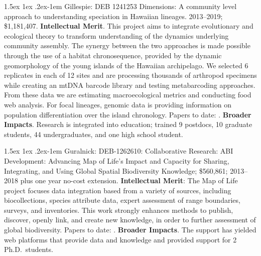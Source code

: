 \documentclass[11pt]{article}
\makeatletter
\renewcommand{\paragraph}{\@startsection{paragraph}{4}{\z@}
  {1.5ex \@plus 1ex \@minus .2ex}{-1em}
  {\normalfont\normalsize\it}
}
\makeatother
\begin{document}
\paragraph{Gillespie}: DEB 1241253 Dimensions: A community level approach
to understanding speciation in Hawaiian lineages. 2013--2019;
\$1,181,407. \textbf{Intellectual Merit}. This project aims to integrate
evolutionary and ecological theory to transform understanding of the
dynamics underlying community assembly. The synergy between the two
approaches is made possible through the use of a habitat chronosequence,
provided by the dynamic geomorphology of the young islands of the
Hawaiian archipelago. We selected 6 replicates in each of 12 sites and
are processing thousands of arthropod specimens while creating an mtDNA
barcode library and testing metabarcoding approaches. From these data we
are estimating macroecological metrics and conducting food web analysis.
For focal lineages, genomic data is providing information on population
differentiation over the island chronology. Papers to date:
\cite{Brewer2015-jo,Brewer2014-xc,Gillespie2013-mz,Shaw2016-aj,Gillespie2016-la,Gillespie2014-xm,Krehenwinkel2017-ea,Rominger2015-kb,Warren2015-zp,Yim2014-pr,Krehenwinkel2018-mz,Krehenwinkel2017-zk,Graham2017-su}.
\textbf{Broader Impacts}. Research is integrated into education; trained
9 postdocs, 10 graduate students, 44 undergraduates, and one high school
student.

\paragraph{Guralnick}: DEB-1262610: Collaborative Research: ABI
Development: Advancing Map of Life's Impact and Capacity for Sharing,
Integrating, and Using Global Spatial Biodiversity Knowledge; \$560,861;
2013--2018 plus one year no-cost extension. \textbf{Intellectual Merit}:
The Map of Life project focuses data integration based from a variety of
sources, including biocollections, species attribute data, expert
assessment of range boundaries, surveys, and inventories. This work
strongly enhances methods to publish, discover, openly link, and create
new knowledge, in order to further assessment of global biodiversity.
Papers to date:
\cite{Guralnick2007-yz,Guralnick2009-zu,Guralnick2010-gw,Jetz2012-uq,Parr2012-gh,Stucky2014-vb,Yilmaz2011-ll}.
\textbf{Broader Impacts}. The support has yielded web platforms that
provide data and knowledge and provided support for 2 Ph.D.~students.
\end{document}
